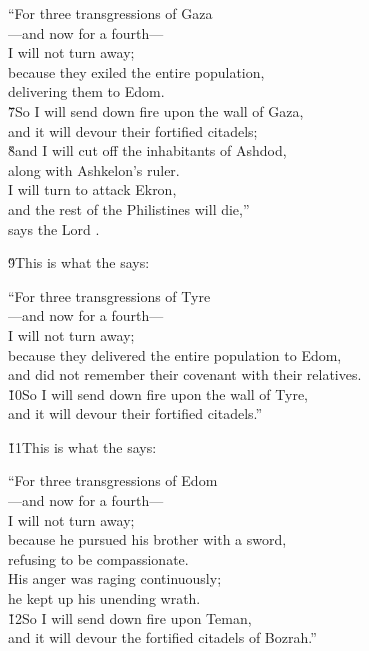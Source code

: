 \begin{poetry}
\poeml ``For three transgressions of Gaza \\
\poemll    ---and now for a fourth--- \\
\poemlll       I will not turn away; \\
\poeml because they exiled the entire population, \\
\poemll    delivering them to Edom. \\
\poeml \v{7}So I will send down fire upon the wall of Gaza, \\
\poemll    and it will devour their fortified citadels; \\
\poeml \v{8}and I will cut off the inhabitants of Ashdod, \\
\poemll    along with Ashkelon's ruler. \\
\poeml I will turn to attack Ekron, \\
\poemll    and the rest of the Philistines will die,'' \\
\poemlll       says the Lord .
\end{poetry}

\v{9}This is what the  says:

\begin{poetry}
\poeml ``For three transgressions of Tyre \\
\poemll    ---and now for a fourth--- \\
\poemlll       I will not turn away; \\
\poeml because they delivered the entire population to Edom, \\
\poemll    and did not remember their covenant with their relatives. \\
\poeml \v{10}So I will send down fire upon the wall of Tyre, \\
\poemll    and it will devour their fortified citadels.''
\end{poetry}

\v{11}This is what the  says:

\begin{poetry}
\poeml ``For three transgressions of Edom \\
\poemll    ---and now for a fourth--- \\
\poemlll       I will not turn away; \\
\poeml because he pursued his brother with a sword, \\
\poemll    refusing to be compassionate. \\
\poeml His anger was raging continuously; \\
\poemll    he kept up his unending wrath. \\
\poeml \v{12}So I will send down fire upon Teman, \\
\poemll    and it will devour the fortified citadels of Bozrah.''
\end{poetry}

